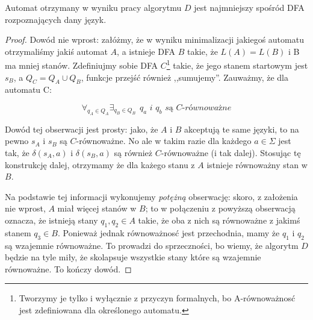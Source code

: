\begin{theorem}
	Automat otrzymany w wyniku pracy algorytmu \(D\) jest najmniejszy spośród DFA rozpoznających dany język.
\end{theorem}
\begin{proof}
	Dowód nie wprost: załóżmy, że w wyniku minimalizacji jakiegoś automatu otrzymaliśmy jakiś automat \(A\), a istnieje DFA \(B\) takie, że \( L(A) = L(B) \) i B ma mniej stanów. Zdefiniujmy sobie DFA \(C\)\footnote{Tworzymy je tylko i wyłącznie z przyczyn formalnych, bo A-równoważnosć jest zdefiniowana dla określonego automatu.} takie, że jego stanem startowym jest \(s_B\), a \(Q_C = Q_A \cup Q_B\), funkcje przejść również ,,sumujemy''. Zauważmy, że dla automatu C:

	\[
		\forall_{q_A \in Q_A} \exists_{q_B \in Q_B}  \hspace{5pt} \textit{\(q_a\) i \(q_b\) są \(C\)-równoważne}
	\]

	Dowód tej obserwacji jest prosty: jako, że \(A\) i \(B\) akceptują te same języki, to na pewno \(s_A\) i \(s_B\) są \(C\)-równoważne. No ale w takim razie dla każdego \(a \in \Sigma\) jest tak, że \(\delta(s_A, a)\) i \(\delta(s_B, a)\) są również \(C\)-równoważne (i tak dalej). Stosując tę konstrukcję dalej, otrzymamy że dla każego stanu z \(A\) istnieje równoważny stan w \(B\).

	Na podstawie tej informacji wykonujemy \textit{potężną} obserwację: skoro, z założenia nie wprost, \(A\) miał więcej stanów w \(B\); to w połączeniu z powyższą obserwacją oznacza, że istnieją stany \(q_1, q_2 \in A\) takie, że oba z nich są równoważne z jakimś stanem \(q_3 \in B\). Ponieważ jednak równoważnosć jest przechodnia, mamy że \(q_1\) i \(q_2\) są wzajemnie równoważne. To prowadzi do sprzeczności, bo wiemy, że algorytm \(D\) będzie na tyle miły, że skolapsuje wszystkie stany które są wzajemnie równoważne. To kończy dowód.

\end{proof}